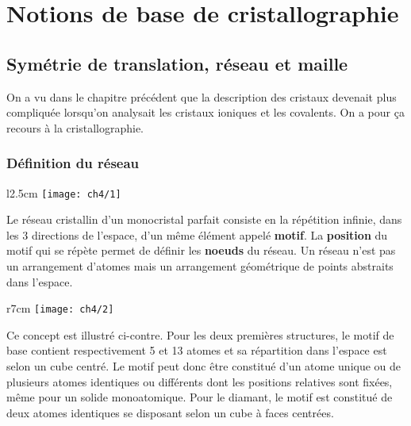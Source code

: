 
\chapter{Notions de base de cristallographie}

\section{Symétrie de translation, réseau et maille}
	On a vu dans le chapitre précédent que la description des cristaux devenait plus compliquée lorsqu'on analysait les cristaux ioniques et les covalents. On a pour ça recours à la cristallographie. 
	\subsection{Définition du réseau}
		\begin{wrapfigure}[4]{l}{2.5cm}
		\vspace{-5mm}
		\texttt{[image: ch4/1]}
		\end{wrapfigure}
		Le réseau cristallin d'un monocristal parfait consiste en la répétition infinie, dans les 3 directions de l'espace, d'un même élément appelé \textbf{motif}. La \textbf{position} du motif qui se répète permet de définir les \textbf{noeuds} du réseau. Un réseau n'est pas un arrangement d'atomes mais un arrangement géométrique de points abstraits dans l'espace. 
		
		\begin{wrapfigure}[6]{r}{7cm}
		\vspace{-5mm}
		\texttt{[image: ch4/2]}
		\end{wrapfigure}
		Ce concept est illustré ci-contre. Pour les deux premières structures, le motif de base contient respectivement 5 et 13 atomes et sa répartition dans l'espace est selon un cube centré. Le motif peut donc être constitué d'un atome unique ou de plusieurs atomes identiques ou différents dont les positions relatives sont fixées, même pour un solide monoatomique. Pour le diamant, le motif est constitué de deux atomes identiques se disposant selon un cube à faces centrées.   
		
